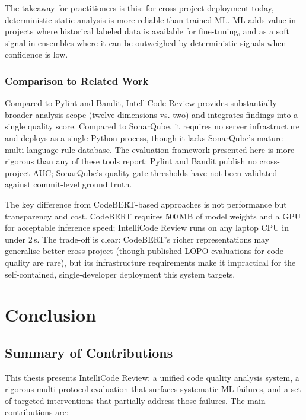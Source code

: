\documentclass[12pt, oneside]{report}
\begin{document}
The takeaway for practitioners is this: for cross-project deployment today, deterministic
static analysis is more reliable than trained ML. ML adds value in projects where
historical labeled data is available for fine-tuning, and as a soft signal in ensembles
where it can be outweighed by deterministic signals when confidence is low.

\subsection{Comparison to Related Work}

Compared to Pylint and Bandit, IntelliCode Review provides substantially broader
analysis scope (twelve dimensions vs. two) and integrates findings into a single quality
score. Compared to SonarQube, it requires no server infrastructure and deploys as a
single Python process, though it lacks SonarQube's mature multi-language rule database.
The evaluation framework presented here is more rigorous than any of these tools
report: Pylint and Bandit publish no cross-project AUC; SonarQube's quality gate
thresholds have not been validated against commit-level ground truth.

The key difference from CodeBERT-based approaches is not performance but transparency
and cost. CodeBERT requires 500\,MB of model weights and a GPU for acceptable inference
speed; IntelliCode Review runs on any laptop CPU in under 2\,s. The trade-off is clear:
CodeBERT's richer representations may generalise better cross-project (though published
LOPO evaluations for code quality are rare), but its infrastructure requirements make
it impractical for the self-contained, single-developer deployment this system targets.

\chapter{Conclusion}
\label{ch:conclusion}

\section{Summary of Contributions}
\label{sec:contributions}

This thesis presents IntelliCode Review: a unified code quality analysis system, a
rigorous multi-protocol evaluation that surfaces systematic ML failures, and a set of
targeted interventions that partially address those failures. The main contributions are:
\end{document}
